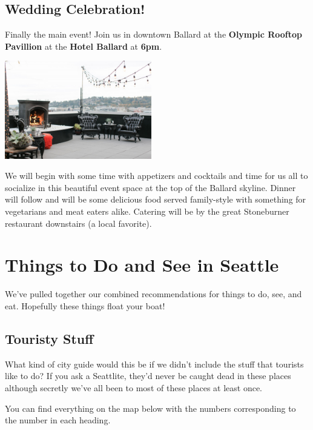 \documentclass[12pt]{article}
\begin{document}
\subsection{Wedding Celebration!}
\label{subsec-wedding}
Finally the main event! Join us in downtown Ballard at the \textbf{Olympic Rooftop Pavillion} at
the \textbf{Hotel Ballard} at \textbf{6pm}.
\begin{center}
    \includegraphics[width=0.48\textwidth]{pavillion}
\end{center}

We will begin with some time with appetizers and cocktails and time for us all to socialize in this beautiful event space at the top of the Ballard skyline.
Dinner will follow and will be some delicious food served family-style with something for vegetarians and meat eaters alike. Catering will 
be by the great Stoneburner restaurant downstairs (a local favorite).

\newpage
\section{Things to Do and See in Seattle}
\label{sec-things-to-do}
We've pulled together our combined recommendations for things to do, see, and eat.
Hopefully these things float your boat!
\renewcommand\thesubsubsection{\arabic{subsubsection}}

\noindent\hrulefill

\subsection{Touristy Stuff}
What kind of city guide would this be if we didn't include the stuff that tourists like 
to do? If you ask a Seattlite, they'd never be caught dead in these places although secretly
we've all been to most of these places at least once.

You can find everything on the map below with the numbers corresponding to the number in each heading.
\end{document}
